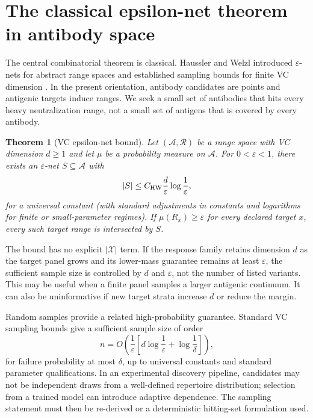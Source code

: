 \documentclass[11pt,a4paper]{article}
\newtheorem{theorem}{Theorem}[section]
\newcommand{\Acal}{\mathcal A}
\newcommand{\Xcal}{\mathcal X}
\newcommand{\Rcal}{\mathcal R}
\newcommand{\eps}{\varepsilon}
\begin{document}
\section{The classical epsilon-net theorem in antibody space}
The central combinatorial theorem is classical. Haussler and Welzl introduced $\eps$-nets for abstract range spaces and established sampling bounds for finite VC dimension \citep{HausslerWelzl1987}. In the present orientation, antibody candidates are points and antigenic targets induce ranges. We seek a small set of antibodies that hits every heavy neutralization range, not a small set of antigens that is covered by every antibody.

\begin{theorem}[VC epsilon-net bound]\label{thm:epsilon} Let $(\Acal,\Rcal)$ be a range space with VC dimension $d\geq1$ and let $\mu$ be a probability measure on $\Acal$. For $0<\eps<1$, there exists an $\eps$-net $S\subseteq\Acal$ with
\begin{equation}|S|\leq C_{\rm HW}\frac{d}{\eps}\log\frac{1}{\eps},\label{eq:epsilonbound}\end{equation}
for a universal constant (with standard adjustments in constants and logarithms for finite or small-parameter regimes). If $\mu(R_x)\geq\eps$ for every declared target $x$, every such target range is intersected by $S$.\end{theorem}

The bound has no explicit $|\Xcal|$ term. If the response family retains dimension $d$ as the target panel grows and its lower-mass guarantee remains at least $\eps$, the sufficient sample size is controlled by $d$ and $\eps$, not the number of listed variants. This may be useful when a finite panel samples a larger antigenic continuum. It can also be uninformative if new target strata increase $d$ or reduce the margin.

Random samples provide a related high-probability guarantee. Standard VC sampling bounds give a sufficient sample size of order
\begin{equation}n=O\!\left(\frac{1}{\eps}\left[d\log\frac{1}{\eps}+\log\frac{1}{\delta}\right]\right),\label{eq:randomsample}\end{equation}
for failure probability at most $\delta$, up to universal constants and standard parameter qualifications. In an experimental discovery pipeline, candidates may not be independent draws from a well-defined repertoire distribution; selection from a trained model can introduce adaptive dependence. The sampling statement must then be re-derived or a deterministic hitting-set formulation used.
\end{document}
